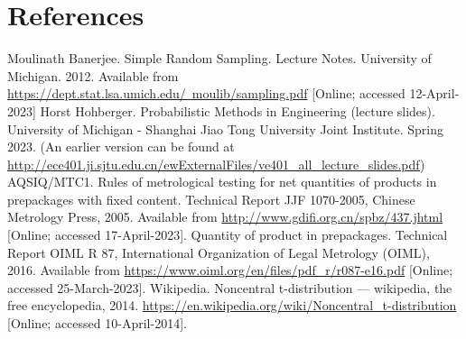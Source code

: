 \documentclass[12pt]{article}
\begin{document}
\newpage
    \section{References}
    \begingroup  %
    \renewcommand{\section}[2]{} 
    \begin{thebibliography}{99}
         Moulinath Banerjee. Simple Random Sampling. Lecture Notes. University of Michigan. 2012. Available from \href{https://dept.stat.lsa.umich.edu/~moulib/sampling.pdf}{https://dept.stat.lsa.umich.edu/~moulib/sampling.pdf} [Online; accessed 12-April-2023]
         Horst Hohberger. Probabilistic Methods in Engineering (lecture slides). University of Michigan - Shanghai Jiao Tong University Joint Institute. Spring 2023. (An earlier version can be found at \href{http://ece401.ji.sjtu.edu.cn/ewExternalFiles/ve401\_all\_lecture\_slides.pdf}{http://ece401.ji.sjtu.edu.cn/ewExternalFiles/ve401\_all\_lecture\_slides.pdf})
         AQSIQ/MTC1. Rules of metrological testing for net quantities of products in prepackages with fixed content. Technical Report JJF 1070-2005, Chinese Metrology Press, 2005. Available from \href{http://www.gdifi.org.cn/spbz/437.jhtml}{http://www.gdifi.org.cn/spbz/437.jhtml} [Online; accessed 17-April-2023].
		 Quantity of product in prepackages. Technical Report OIML R 87, International Organization of Legal Metrology (OIML), 2016. Available from \href{https://www.oiml.org/en/files/pdf\_r/r087-e16.pdf}{https://www.oiml.org/en/files/pdf\_r/r087-e16.pdf} [Online; accessed 25-March-2023].
         Wikipedia. Noncentral t-distribution — wikipedia, the free encyclopedia, 2014. \href{https://en.wikipedia.org/wiki/Noncentral\_t-distribution}{https://en.wikipedia.org/wiki/Noncentral\_t-distribution} [Online; accessed 10-April-2014].
    \end{thebibliography}
    \endgroup
\end{document}
